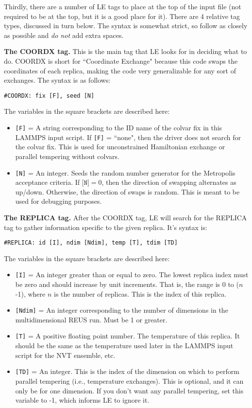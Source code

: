 \documentclass[10pt]{article}
\begin{document}
Thirdly, there are a number of LE tags to place
at the top of the input file (not required to be at the top, but it is a good place for it). 
There are 4 relative tag types, discussed in turn below. The syntax is somewhat strict,
so follow as closely as possible and {\em do not} add extra spaces.

\textbf{The COORDX tag.}
This is the main tag that LE looks for in deciding what to do. COORDX is
short for ``Coordinate Exchange" because this code swaps the coordinates of each replica,
making the code very generalizable for any sort of exchanges.
The syntax is as follows:
\begin{verbatim}
#COORDX: fix [F], seed [N]
\end{verbatim}
The variables in the square brackets are described here:
\begin{itemize}
\item	\texttt{[F]} = A string corresponding to the ID name of the colvar fix
		in this LAMMPS input script. If \texttt{[F]} = ``none", then the driver does
		not search for the colvar fix. This is used for unconstrained Hamiltonian exchange
		or parallel tempering without colvars.
\item	\texttt{[N]} = An integer. Seeds the random number generator for the Metropolis
		acceptance criteria.
		If $\texttt{[N]} = 0$,
		then the direction of swapping alternates as up/down. Otherwise, the direction of swaps
		is random. This is meant to be used for debugging purposes.
\end{itemize}

\textbf{The REPLICA tag.}
After the COORDX tag, LE will search for the REPLICA tag to gather information specific
to the given replica. It's syntax is:
\begin{verbatim}
#REPLICA: id [I], ndim [Ndim], temp [T], tdim [TD]
\end{verbatim}
The variables in the square brackets are described here:
\begin{itemize}
\item	\texttt{[I]} = An integer greater than or equal to zero. The lowest
		replica index must be zero and should increase by unit increments. That is,
		the range is 0 to ($n$-1), where $n$ is the number of replicas. This is
		the index of this replica.
\item	\texttt{[Ndim]} = An integer corresponding to the number of dimensions
		in the multidimensional REUS run. Must be 1 or greater.
\item	\texttt{[T]} = A positive floating point number. The temperature of this replica.
		It should be the same as the temperature used later in the LAMMPS input script
		for the NVT ensemble, etc.
\item	\texttt{[TD]} = An integer. This is the index of the dimension on which to perform
		parallel tempering (i.e., temperature exchanges). This is optional, and it can only be
		for one dimension. If you don't want any parallel tempering, set this variable to -1,
		which informs LE to ignore it.
\end{itemize}
\end{document}
